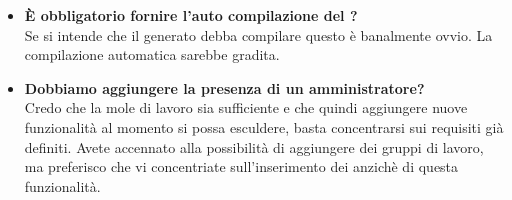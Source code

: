 \begin{itemize}
\\
	  		   	\item 
	   		\textbf{È obbligatorio fornire l'auto compilazione del ?} \\
	    	\justifying     		
Se si intende che il  generato debba compilare questo è banalmente ovvio. La compilazione automatica sarebbe gradita.
\\
		  		   	\item 
	   		\textbf{Dobbiamo aggiungere la presenza di un  amministratore?} \\
	    	\justifying     		
Credo che la mole di lavoro sia sufficiente e che quindi aggiungere nuove funzionalità al momento si possa esculdere, basta concentrarsi sui requisiti già definiti. Avete accennato alla possibilità di aggiungere dei gruppi di lavoro, ma preferisco che vi concentriate sull'inserimento dei  anzichè di questa funzionalità.
\\
	   	 \end{itemize}
